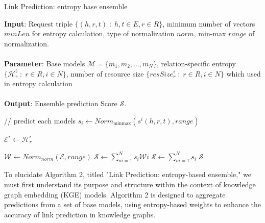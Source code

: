 \documentclass{article}
\begin{document}
\begin{algorithm}[!htb]
    \caption{Link Prediction: entropy base ensemble}
    \label{alg:linkPredict}
    \textbf{Input}: Request triple $\{(h, r, t) \;:\; h,t \in E, r \in R\}$, minimum number of vectors $minLen$ for entropy calculation, type of normalization $norm$, min-max $range$ of normalization.\\\\
    \textbf{Parameter}: Base models $\mathcal{M} = \{m_1, m_2, \ldots, m_N\}$, relation-specific entropy $\{\mathcal{H}_r^{i} \;:\; r \in R, i \in N\}$, number of resource size $\{resSize_r^{i} \;:\; r \in R, i \in N\}$ which used in entropy calculation \\\\
    \textbf{Output}: Ensemble prediction Score $\mathcal{S}$.\\
    \begin{algorithmic}[1] %
        
            \Statex \hspace*{1em} // predict each models
            \State $s\acute{}_i \leftarrow Norm_{\text{minmax}}(s^i(h, r, t), range)$
            
            \vspace{3pt}
                \State $\mathcal{E}^i \leftarrow \mathcal{H}_r^{i}$
            \EndIf
        \EndFor
        \Statex

            \State $\mathcal{W} \leftarrow Norm_{norm}(\mathcal{E}, range)$
            \vspace{3pt}
            \State $\mathcal{S} \leftarrow \sum_{m=1}^{N} s\acute{}_i \mathcal{W}i$
        \Else
            \State $\mathcal{S} \leftarrow \sum_{m=1}^{N} s\acute{}_i $
        \EndIf
        \Statex
        \State \Return $\mathcal{S}$
    \end{algorithmic}
\end{algorithm}

\vspace{10pt}

To elucidate Algorithm 2, titled "Link Prediction: entropy-based ensemble," we must first understand its purpose and structure within the context of knowledge graph embedding (KGE) models. Algorithm 2 is designed to aggregate predictions from a set of base models, using entropy-based weights to enhance the accuracy of link prediction in knowledge graphs.
\end{document}
